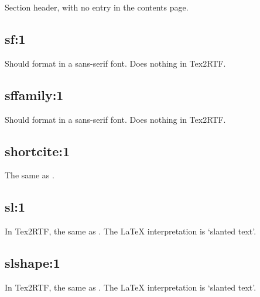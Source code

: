 Section header, with no entry in the contents page.

\subsection*{sf:1}\label{sf}

Should format in a sans-serif font. Does nothing in Tex2RTF.

\subsection*{sffamily:1}\label{sffamily}

Should format in a sans-serif font. Does nothing in Tex2RTF.

\subsection*{shortcite:1}\label{shortcite}

The same as .


\subsection*{sl:1}\label{sl}

In Tex2RTF, the same as . The LaTeX interpretation is `slanted text'.

\subsection*{slshape:1}\label{slshape}

In Tex2RTF, the same as . The LaTeX interpretation is `slanted text'.

